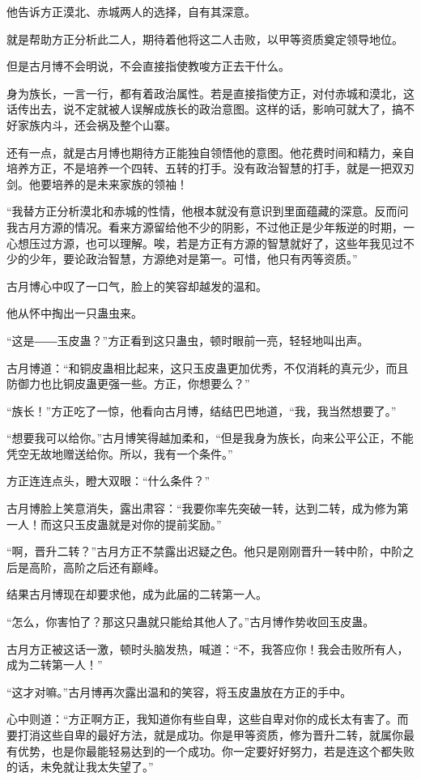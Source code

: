 \begin{this_body}
他告诉方正漠北、赤城两人的选择，自有其深意。

就是帮助方正分析此二人，期待着他将这二人击败，以甲等资质奠定领导地位。

但是古月博不会明说，不会直接指使教唆方正去干什么。

身为族长，一言一行，都有着政治属性。若是直接指使方正，对付赤城和漠北，这话传出去，说不定就被人误解成族长的政治意图。这样的话，影响可就大了，搞不好家族内斗，还会祸及整个山寨。

还有一点，就是古月博也期待方正能独自领悟他的意图。他花费时间和精力，亲自培养方正，不是培养一个四转、五转的打手。没有政治智慧的打手，就是一把双刃剑。他要培养的是未来家族的领袖！

“我替方正分析漠北和赤城的性情，他根本就没有意识到里面蕴藏的深意。反而问我古月方源的情况。看来方源留给他不少的阴影，不过他正是少年叛逆的时期，一心想压过方源，也可以理解。唉，若是方正有方源的智慧就好了，这些年我见过不少的少年，要论政治智慧，方源绝对是第一。可惜，他只有丙等资质。”

古月博心中叹了一口气，脸上的笑容却越发的温和。

他从怀中掏出一只蛊虫来。

“这是――玉皮蛊？”方正看到这只蛊虫，顿时眼前一亮，轻轻地叫出声。

古月博道：“和铜皮蛊相比起来，这只玉皮蛊更加优秀，不仅消耗的真元少，而且防御力也比铜皮蛊更强一些。方正，你想要么？”

“族长！”方正吃了一惊，他看向古月博，结结巴巴地道，“我，我当然想要了。”

“想要我可以给你。”古月博笑得越加柔和，“但是我身为族长，向来公平公正，不能凭空无故地赠送给你。所以，我有一个条件。”

方正连连点头，瞪大双眼：“什么条件？”

古月博脸上笑意消失，露出肃容：“我要你率先突破一转，达到二转，成为修为第一人！而这只玉皮蛊就是对你的提前奖励。”

“啊，晋升二转？”古月方正不禁露出迟疑之色。他只是刚刚晋升一转中阶，中阶之后是高阶，高阶之后还有巅峰。

结果古月博现在却要求他，成为此届的二转第一人。

“怎么，你害怕了？那这只蛊就只能给其他人了。”古月博作势收回玉皮蛊。

古月方正被这话一激，顿时头脑发热，喊道：“不，我答应你！我会击败所有人，成为二转第一人！”

“这才对嘛。”古月博再次露出温和的笑容，将玉皮蛊放在方正的手中。

心中则道：“方正啊方正，我知道你有些自卑，这些自卑对你的成长太有害了。而要打消这些自卑的最好方法，就是成功。你是甲等资质，修为晋升二转，就属你最有优势，也是你最能轻易达到的一个成功。你一定要好好努力，若是连这个都失败的话，未免就让我太失望了。”


\end{this_body}
